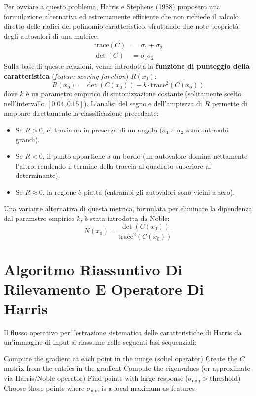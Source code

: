 ﻿\documentclass[11pt, a4paper]{article}
\begin{document}
Per ovviare a questo problema, Harris e Stephens (1988) proposero una formulazione alternativa ed estremamente efficiente che non richiede il calcolo diretto delle radici del polinomio caratteristico, sfruttando due note proprietà degli autovalori di una matrice:
\begin{align*}
    \text{trace}(C) &= \sigma_1 + \sigma_2 \\
    \det(C) &= \sigma_1 \sigma_2
\end{align*}
Sulla base di queste relazioni, venne introdotta la \textbf{funzione di punteggio della caratteristica} (\emph{feature scoring function}) $R(x_0)$:
\begin{equation}
    \boxed{R(x_0) = \det(C(x_0)) - k \cdot \text{trace}^2(C(x_0))}
\end{equation}
dove $k$ è un parametro empirico di sintonizzazione costante (solitamente scelto nell'intervallo $[0.04, 0.15]$). L'analisi del segno e dell'ampiezza di $R$ permette di mappare direttamente la classificazione precedente:
\begin{itemize}[noitemsep]
    \item Se $R > 0$, ci troviamo in presenza di un angolo ($\sigma_1$ e $\sigma_2$ sono entrambi grandi).
    \item Se $R < 0$, il punto appartiene a un bordo (un autovalore domina nettamente l'altro, rendendo il termine della traccia al quadrato superiore al determinante).
    \item Se $R \approx 0$, la regione è piatta (entrambi gli autovalori sono vicini a zero).
\end{itemize}

Una variante alternativa di questa metrica, formulata per eliminare la dipendenza dal parametro empirico $k$, è stata introdotta da Noble:
\begin{equation}
    \boxed{N(x_0) = \frac{\det(C(x_0))}{\text{trace}^2(C(x_0))}}
\end{equation}

\newpage

\section{Algoritmo Riassuntivo Di Rilevamento E Operatore Di Harris}

Il flusso operativo per l'estrazione sistematica delle caratteristiche di Harris da un'immagine di input si riassume nelle seguenti fasi sequenziali:

\begin{algorithm}[H]
    \caption{Algoritmo di Rilevamento Angoli di Harris}
    \Inizializza\;
    Compute the gradient at each point in the image (sobel operator)\;
    Create the $C$ matrix from the entries in the gradient\;
    Compute the eigenvalues (or approximate via Harris/Noble operator)\;
    Find points with large response ($\sigma_{\min} > \text{threshold}$)\;
    Choose those points where $\sigma_{\min}$ is a local maximum as features\;
\end{algorithm}
\end{document}
